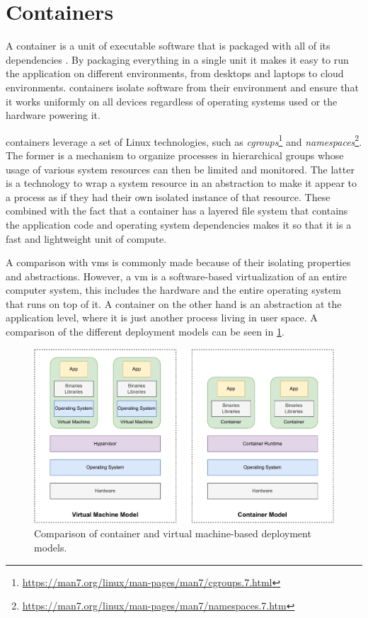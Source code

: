 \section{Containers}
\label{sec:background:containers}


A \gls{container} is a unit of executable software that is packaged with all of its dependencies \cite{docker-what-is-container, ibm-what-is-container}. By packaging everything in a single unit it makes it easy to run the application on different environments, from desktops and laptops to cloud environments. \Glspl{container} isolate software from their environment and ensure that it works uniformly on all devices regardless of operating systems used or the hardware powering it. 




\Glspl{container} leverage a set of Linux technologies, such as \textit{cgroups}\footnote{\url{https://man7.org/linux/man-pages/man7/cgroups.7.html}} and \textit{namespaces}\footnote{\url{https://man7.org/linux/man-pages/man7/namespaces.7.htm}}. The former is a mechanism to organize processes in hierarchical groups whose usage of various system resources can then be limited and monitored. The latter is a technology to wrap a system resource in an abstraction to make it appear to a process as if they had their own isolated instance of that resource. These combined with the fact that a container has a layered file system that contains the application code and operating system dependencies makes it so that it is a fast and lightweight unit of compute. 

A comparison with \glspl{vm} is commonly made because of their isolating properties and abstractions. However, a \gls{vm} is a software-based virtualization of an entire computer system, this includes the hardware and the entire operating system that runs on top of it. A \gls{container} on the other hand is an abstraction at the application level, where it is just another process living in user space. A comparison of the different deployment models can be seen in \cref{fig:vm-vs-container}.


\begin{figure}[!t]
    \centering
    
    \includegraphics[width=.9\linewidth]{2_background/figures/vm-vs-container.pdf}

    \caption[Container and virtual machine-based deployment models]{Comparison of container and virtual machine-based deployment models.}
    \label{fig:vm-vs-container}
\end{figure}

